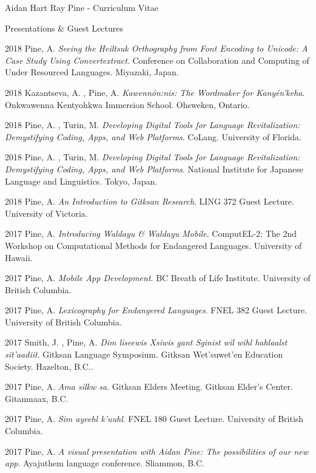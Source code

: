 \documentclass[12pt]{letter}
\begin{document}
\begin{cv}{ Aidan Hart Ray Pine  \space - \space   Curriculum Vitae}
\begin{cvlist}{Presentations \& Guest Lectures}
                    \item[2018]  Pine,  A.   \textit{Seeing the Heiltsuk Orthography from Font Encoding to Unicode: A Case Study Using Convertextract}. Conference on Collaboration and Computing of Under Resourced Languages. Miyazaki, Japan.  
                    \item[2018]  Kazantseva,  A. ,  Pine,  A.   \textit{Kawenn{\'o}n:nis: The Wordmaker for Kany{\'e}n'keha}. Onkwawenna Kentyohkwa Immersion School. Ohsweken, Ontario.  
                    \item[2018]  Pine,  A. ,  Turin,  M.   \textit{Developing Digital Tools for Language Revitalization: Demystifying Coding, Apps, and Web Platforms}. CoLang. University of Florida.  
                    \item[2018]  Pine,  A. ,  Turin,  M.   \textit{Developing Digital Tools for Language Revitalization: Demystifying Coding, Apps, and Web Platforms}. National Institute for Japanese Language and Linguistics. Tokyo, Japan.  
                    \item[2018]  Pine,  A.   \textit{An Introduction to Gitksan Research}. LING 372 Guest Lecture. University of Victoria.  
                    \item[2017]  Pine,  A.   \textit{Introducing Waldayu \& Waldayu Mobile}. ComputEL-2: The 2nd Workshop on Computational Methods for Endangered Languages. University of Hawaii.  
                    \item[2017]  Pine,  A.   \textit{Mobile App Development}. BC Breath of Life Institute. University of British Columbia.  
                    \item[2017]  Pine,  A.   \textit{Lexicography for Endangered Languages}. FNEL 382 Guest Lecture. University of British Columbia.  
                    \item[2017]  Smith,  J. ,  Pine,  A.   \textit{Dim liseewis Xsiwis g̲ant Sginist wil wihl hahlaalst sit'aadiit}. Gitksan Language Symposium. Gitksan Wet'suwet'en Education Society. Hazelton, B.C..  
                    \item[2017]  Pine,  A.   \textit{Ama silkw sa}. Gitksan Elders Meeting. Gitksan Elder's Center. Gitanmaax, B.C.  
                    \item[2017]  Pine,  A.   \textit{Sim ayeehl k'uuhl}. FNEL 180 Guest Lecture. University of British Columbia.  
                    \item[2017]  Pine,  A.   \textit{A visual presentation with Aidan Pine: The possibilities of our new app}. Ayajuthem language conference. Sliammon, B.C.  

\end{cvlist}
\end{cv}
\end{document}
